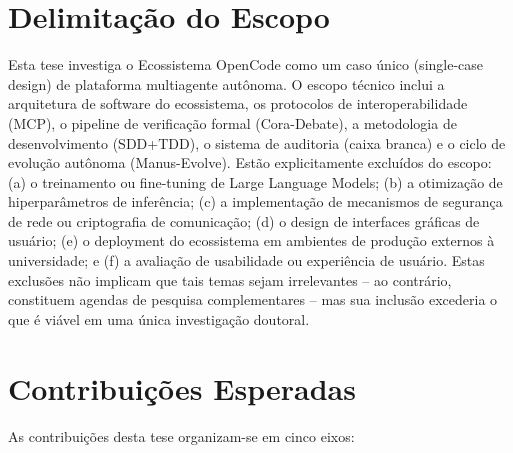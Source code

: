\documentclass[12pt,a4paper,sumario=tradicional,openany]{abntex2}
\begin{document}
\section{Delimitação do Escopo}

Esta tese investiga o Ecossistema OpenCode como um caso único (single-case design) de plataforma multiagente autônoma. O escopo técnico inclui a arquitetura de software do ecossistema, os protocolos de interoperabilidade (MCP), o pipeline de verificação formal (Cora-Debate), a metodologia de desenvolvimento (SDD+TDD), o sistema de auditoria (caixa branca) e o ciclo de evolução autônoma (Manus-Evolve). Estão explicitamente excluídos do escopo: (a) o treinamento ou fine-tuning de Large Language Models; (b) a otimização de hiperparâmetros de inferência; (c) a implementação de mecanismos de segurança de rede ou criptografia de comunicação; (d) o design de interfaces gráficas de usuário; (e) o deployment do ecossistema em ambientes de produção externos à universidade; e (f) a avaliação de usabilidade ou experiência de usuário. Estas exclusões não implicam que tais temas sejam irrelevantes -- ao contrário, constituem agendas de pesquisa complementares -- mas sua inclusão excederia o que é viável em uma única investigação doutoral.

\section{Contribuições Esperadas}

As contribuições desta tese organizam-se em cinco eixos:
\end{document}
